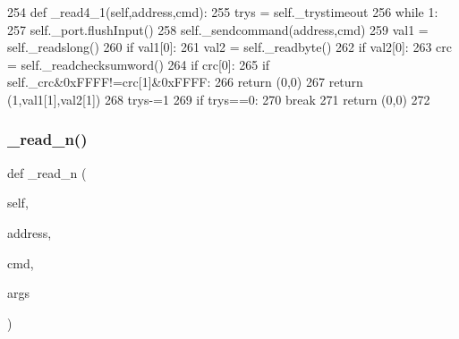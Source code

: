 \begin{DoxyCode}
254     \textcolor{keyword}{def }\_read4\_1(self,address,cmd):
255         trys = self.\_trystimeout
256         \textcolor{keywordflow}{while} 1:
257             self.\_port.flushInput()
258             self.\_sendcommand(address,cmd)
259             val1 = self.\_readslong()
260             \textcolor{keywordflow}{if} val1[0]:
261                 val2 = self.\_readbyte()
262                 \textcolor{keywordflow}{if} val2[0]:
263                     crc = self.\_readchecksumword()
264                     \textcolor{keywordflow}{if} crc[0]:
265                         \textcolor{keywordflow}{if} self.\_crc&0xFFFF!=crc[1]&0xFFFF:
266                             \textcolor{keywordflow}{return} (0,0)
267                         \textcolor{keywordflow}{return} (1,val1[1],val2[1])
268             trys-=1
269             \textcolor{keywordflow}{if} trys==0:
270                 \textcolor{keywordflow}{break}
271         \textcolor{keywordflow}{return} (0,0)
272 
\end{DoxyCode}
\mbox{\label{classtoxic__hardware_1_1roboclaw__3_1_1Roboclaw_a6758fe3e66445946e27903a47e330d5b}} 
\subsubsection{\texorpdfstring{\+\_\+read\+\_\+n()}{\_read\_n()}}
{\footnotesize\ttfamily def \+\_\+read\+\_\+n (\begin{DoxyParamCaption}\item[{}]{self,  }\item[{}]{address,  }\item[{}]{cmd,  }\item[{}]{args }\end{DoxyParamCaption})\hspace{0.3cm}{\ttfamily [private]}}


